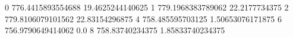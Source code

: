 0 776.4415893554688 19.4625244140625
1 779.1968383789062 22.2177734375
2 779.8106079101562 22.83154296875
4 758.485595703125 1.50653076171875
6 756.9790649414062 0.0
8 758.83740234375 1.85833740234375
